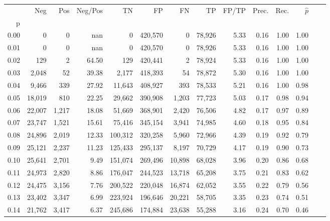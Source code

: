 \begin{tabular}{rrrrrrrrrrrrrr}
\toprule
{} &     Neg &    Pos & Neg/Pos &       TN &       FP &      FN &      TP & FP/TP & Prec. &  Rec. & $\hat{p}$ \\
p    &         &        &         &          &          &         &         &       &       &       &           \\
\midrule
0.00 &       0 &      0 &     nan &        0 &  420,570 &       0 &  78,926 &  5.33 &  0.16 &  1.00 &      1.00 \\
0.01 &       0 &      0 &     nan &        0 &  420,570 &       0 &  78,926 &  5.33 &  0.16 &  1.00 &      1.00 \\
0.02 &     129 &      2 &   64.50 &      129 &  420,441 &       2 &  78,924 &  5.33 &  0.16 &  1.00 &      1.00 \\
0.03 &   2,048 &     52 &   39.38 &    2,177 &  418,393 &      54 &  78,872 &  5.30 &  0.16 &  1.00 &      1.00 \\
0.04 &   9,466 &    339 &   27.92 &   11,643 &  408,927 &     393 &  78,533 &  5.21 &  0.16 &  1.00 &      0.98 \\
0.05 &  18,019 &    810 &   22.25 &   29,662 &  390,908 &   1,203 &  77,723 &  5.03 &  0.17 &  0.98 &      0.94 \\
0.06 &  22,007 &  1,217 &   18.08 &   51,669 &  368,901 &   2,420 &  76,506 &  4.82 &  0.17 &  0.97 &      0.89 \\
0.07 &  23,747 &  1,521 &   15.61 &   75,416 &  345,154 &   3,941 &  74,985 &  4.60 &  0.18 &  0.95 &      0.84 \\
0.08 &  24,896 &  2,019 &   12.33 &  100,312 &  320,258 &   5,960 &  72,966 &  4.39 &  0.19 &  0.92 &      0.79 \\
0.09 &  25,121 &  2,237 &   11.23 &  125,433 &  295,137 &   8,197 &  70,729 &  4.17 &  0.19 &  0.90 &      0.73 \\
0.10 &  25,641 &  2,701 &    9.49 &  151,074 &  269,496 &  10,898 &  68,028 &  3.96 &  0.20 &  0.86 &      0.68 \\
0.11 &  24,973 &  2,820 &    8.86 &  176,047 &  244,523 &  13,718 &  65,208 &  3.75 &  0.21 &  0.83 &      0.62 \\
0.12 &  24,475 &  3,156 &    7.76 &  200,522 &  220,048 &  16,874 &  62,052 &  3.55 &  0.22 &  0.79 &      0.56 \\
0.13 &  23,402 &  3,347 &    6.99 &  223,924 &  196,646 &  20,221 &  58,705 &  3.35 &  0.23 &  0.74 &      0.51 \\
0.14 &  21,762 &  3,417 &    6.37 &  245,686 &  174,884 &  23,638 &  55,288 &  3.16 &  0.24 &  0.70 &      0.46 \\

\end{tabular}
